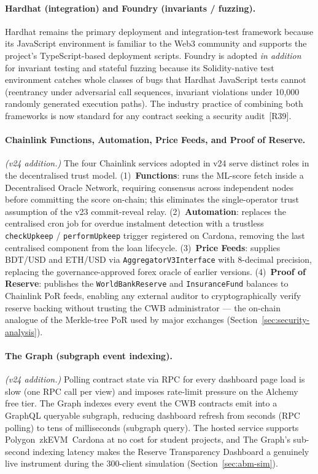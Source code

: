 \paragraph{Hardhat (integration) and Foundry (invariants / fuzzing).}
Hardhat remains the primary deployment and integration-test framework because
its JavaScript environment is familiar to the Web3 community and supports
the project's TypeScript-based deployment scripts. Foundry is adopted
\emph{in addition} for invariant testing and stateful fuzzing because its
Solidity-native test environment catches whole classes of bugs that Hardhat
JavaScript tests cannot (reentrancy under adversarial call sequences,
invariant violations under 10,000 randomly generated execution paths). The
industry practice of combining both frameworks is now standard for any
contract seeking a security audit~[R39].

\paragraph{Chainlink Functions, Automation, Price Feeds, and Proof of Reserve.}
\emph{(v24 addition.)} The four Chainlink services adopted in v24 serve
distinct roles in the decentralised trust model.
(1)~\textbf{Functions}: runs the ML-score fetch inside a
Decentralised Oracle Network, requiring consensus across independent nodes
before committing the score on-chain; this eliminates the single-operator
trust assumption of the v23 commit-reveal relay.
(2)~\textbf{Automation}: replaces the centralised cron job for overdue
instalment detection with a trustless \texttt{checkUpkeep} /
\texttt{performUpkeep} trigger registered on Cardona, removing the last
centralised component from the loan lifecycle.
(3)~\textbf{Price Feeds}: supplies BDT/USD and ETH/USD via
\texttt{AggregatorV3Interface} with 8-decimal precision, replacing the
governance-approved forex oracle of earlier versions.
(4)~\textbf{Proof of Reserve}: publishes the \texttt{WorldBankReserve} and
\texttt{InsuranceFund} balances to Chainlink PoR feeds, enabling any
external auditor to cryptographically verify reserve backing without
trusting the CWB administrator --- the on-chain analogue of the Merkle-tree
PoR used by major exchanges (Section~\ref{sec:security-analysis}).

\paragraph{The Graph (subgraph event indexing).}
\emph{(v24 addition.)} Polling contract state via RPC for every dashboard
page load is slow (one RPC call per view) and imposes rate-limit pressure
on the Alchemy free tier. The Graph indexes every event the CWB contracts
emit into a GraphQL queryable subgraph, reducing dashboard refresh from
seconds (RPC polling) to tens of milliseconds (subgraph query). The hosted
service supports Polygon~zkEVM~Cardona at no cost for student projects, and
The Graph's sub-second indexing latency makes the Reserve Transparency
Dashboard a genuinely live instrument during the 300-client simulation
(Section~\ref{sec:abm-sim}).

